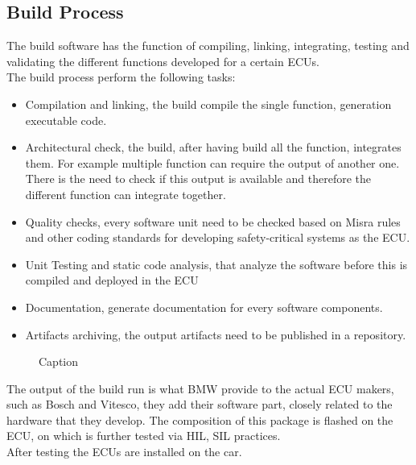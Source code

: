 \documentclass[../main.tex]{subfiles}
\begin{document}
\subsection{Build Process}
\label{subsection:Build process}
The build software has the function of compiling, linking, integrating, testing and validating the different functions developed for a certain ECUs. \\
The build process perform the following tasks:
\begin{itemize}
    \item Compilation and linking, the build compile the single function, generation executable code. 
    \item Architectural check, the build, after having build all the function, integrates them. For example multiple function can require the output of another one. There is the need to check if this output is available and therefore the different function can integrate together.
    \item Quality checks, every software unit need to be checked based on Misra rules and other coding standards for developing safety-critical systems as the ECU.
    \item Unit Testing and static code analysis, that analyze the software before this is compiled and deployed in the ECU
    \item Documentation, generate documentation for every software components. 
    \item Artifacts archiving, the output artifacts need to be published in a repository. 
\end{itemize}
\begin{figure}[H]
    \centering
    \caption{Caption}
    \label{fig:my_label}
\end{figure}
The output of the build run is what BMW provide to the actual ECU makers, such as Bosch and Vitesco, they add their software part, closely related to the hardware that they develop. The composition of this package is flashed on the ECU, on which is further tested via HIL, SIL practices.\\
After testing the ECUs are installed on the car.
\end{document}
